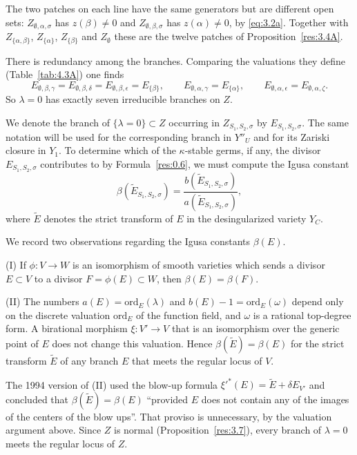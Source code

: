 \documentclass[12pt,letterpaper]{amsart}
\theoremstyle{plain}
\theoremstyle{definition}
\theoremstyle{remark}
\theoremstyle{definition}
\begin{document}
The two patches on each line have the same generators but are different open
sets: $Z_{\emptyset,\alpha,\sigma}$ has $z(\beta)\neq0$ and
$Z_{\emptyset,\beta,\sigma}$ has $z(\alpha)\neq0$, by \eqref{eq:3.2a}.
Together with $Z_{\{\alpha,\beta\}}$, $Z_{\{\alpha\}}$, $Z_{\{\beta\}}$ and
$Z_\emptyset$ these are the twelve patches of Proposition~\ref{res:3.4A}.

There is redundancy among the branches. Comparing the valuations they define
(Table~\ref{tab:4.3A}) one finds
\[
E_{\emptyset,\beta,\gamma}=E_{\emptyset,\beta,\delta}=
E_{\emptyset,\beta,\epsilon}=E_{\{\beta\}},\qquad
E_{\emptyset,\alpha,\gamma}=E_{\{\alpha\}},\qquad
E_{\emptyset,\alpha,\epsilon}=E_{\emptyset,\alpha,\zeta}.
\]
So $\lambda=0$ has exactly seven irreducible branches on $Z$.

We denote the branch of $\{\lambda =0\}\subset Z$
occurring in $Z_{S_1,S_2,\sigma}$ by $E_{S_1,S_2,\sigma}$. The same notation
will be used for the corresponding branch in $Y''_U$ and for its Zariski closure
in $Y_1$. To determine which of the $\kappa$-stable germs, if any,
the divisor $E_{S_1,S_2,\sigma}$
contributes to by Formula~\ref{res:0.6},
we must compute the Igusa constant
\begin{equation}\tag{4.2}\label{eq:4.2}
\beta(\tilde{E}_{S_1,S_2,\sigma})=
\frac{b(\tilde{E}_{S_1,S_2,\sigma})}{a(\tilde{E}_{S_1,S_2,\sigma})},
\end{equation}
where $\tilde{E}$ denotes the strict transform of $E$ in the
desingularized variety $Y_C$.

We record two observations regarding the Igusa constants $\beta(E)$.

\smallskip\noindent
(I) If $\phi:V\rightarrow W$ is an isomorphism of smooth varieties
which sends a divisor $E\subset V$ to a divisor $F=\phi(E)\subset W$,
then $\beta(E)=\beta(F)$.

\smallskip\noindent
(II) The numbers $a(E)=\mathrm{ord}_E(\lambda)$ and
$b(E)-1=\mathrm{ord}_E(\omega)$ depend only on the discrete valuation
$\mathrm{ord}_E$ of the function field, and $\omega$ is a rational top-degree
form. A birational morphism $\xi:V'\to V$ that is an isomorphism over the
generic point of $E$ does not change this valuation. Hence
$\beta(\tilde E)=\beta(E)$ for the strict transform $\tilde E$ of any branch
$E$ that meets the regular locus of $V$.

\begin{rem26}\label{rem:4.II}
The 1994 version of (II) used the blow-up formula
${\xi'}^*(E)=\tilde{E}+\delta E_{V'}$ and concluded that
$\beta(\tilde E)=\beta(E)$ ``provided $E$ does not contain any of the images
of the centers of the blow ups''. That proviso is unnecessary, by the
valuation argument above. Since $Z$ is normal (Proposition~\ref{res:3.7}),
every branch of $\lambda=0$ meets the regular locus of $Z$.
\end{rem26}
\end{document}
